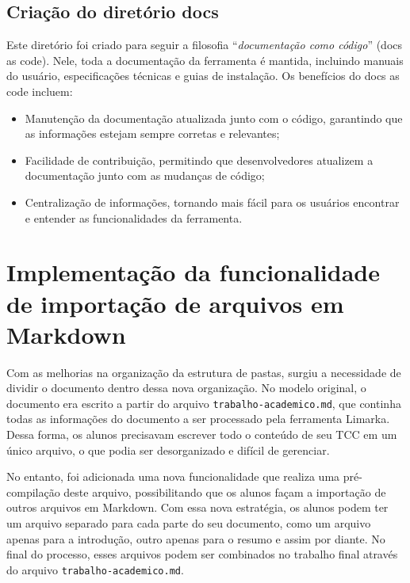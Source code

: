\documentclass[
	12pt,				%
	oneside,			%
	a4paper,			%
	english,			%
	french,				%
	spanish,			%
	brazil				%
	]{abntex2}
\begin{document}
\hypertarget{criauxe7uxe3o-do-diretuxf3rio-docs}{%
\subsection{Criação do diretório
docs}\label{criauxe7uxe3o-do-diretuxf3rio-docs}}

Este diretório foi criado para seguir a filosofia ``\emph{documentação
como código}'' (docs as code). Nele, toda a documentação da ferramenta é
mantida, incluindo manuais do usuário, especificações técnicas e guias
de instalação. Os benefícios do docs as code incluem:

\begin{itemize}
\tightlist
\item
  Manutenção da documentação atualizada junto com o código, garantindo
  que as informações estejam sempre corretas e relevantes;
\item
  Facilidade de contribuição, permitindo que desenvolvedores atualizem a
  documentação junto com as mudanças de código;
\item
  Centralização de informações, tornando mais fácil para os usuários
  encontrar e entender as funcionalidades da ferramenta.
\end{itemize}

\hypertarget{implementauxe7uxe3o-da-funcionalidade-de-importauxe7uxe3o-de-arquivos-em-markdown}{%
\section{Implementação da funcionalidade de importação de arquivos em
Markdown}\label{implementauxe7uxe3o-da-funcionalidade-de-importauxe7uxe3o-de-arquivos-em-markdown}}

Com as melhorias na organização da estrutura de pastas, surgiu a
necessidade de dividir o documento dentro dessa nova organização. No
modelo original, o documento era escrito a partir do arquivo
\texttt{trabalho-academico.md}, que continha todas as informações do
documento a ser processado pela ferramenta Limarka. Dessa forma, os
alunos precisavam escrever todo o conteúdo de seu TCC em um único
arquivo, o que podia ser desorganizado e difícil de gerenciar.

No entanto, foi adicionada uma nova funcionalidade que realiza uma
pré-compilação deste arquivo, possibilitando que os alunos façam a
importação de outros arquivos em Markdown. Com essa nova estratégia, os
alunos podem ter um arquivo separado para cada parte do seu documento,
como um arquivo apenas para a introdução, outro apenas para o resumo e
assim por diante. No final do processo, esses arquivos podem ser
combinados no trabalho final através do arquivo
\texttt{trabalho-academico.md}.
\end{document}
